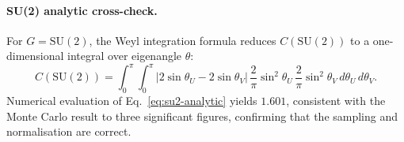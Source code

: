 \paragraph{SU(2) analytic cross-check.}
For $G=\mathrm{SU}(2)$, the Weyl integration formula reduces
$C(\mathrm{SU}(2))$ to a one-dimensional integral over eigenangle $\theta$:
\begin{equation}
  C(\mathrm{SU}(2))
  = \int_0^\pi\!\int_0^\pi
    \bigl|2\sin\theta_U - 2\sin\theta_V\bigr|\,
    \frac{2}{\pi}\sin^2\!\theta_U\,\frac{2}{\pi}\sin^2\!\theta_V
    \,d\theta_U\,d\theta_V.
  \label{eq:su2-analytic}
\end{equation}
Numerical evaluation of Eq.~\eqref{eq:su2-analytic} yields $1.601$, consistent
with the Monte Carlo result to three significant figures, confirming that the
sampling and normalisation are correct.
